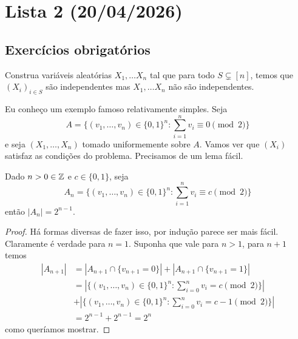 \section{Lista 2 (20/04/2026)}

\subsection{Exercícios obrigatórios}
\begin{exercise}
	\label{lista2:ex1}
	Construa variáveis aleatórias $X_1, \dots X_n$ tal que para todo
	$S \subsetneq [n]$,
	temos que $(X_i)_{i \in S}$ são independentes mas $X_1, \dots X_n$
	não são independentes.
\end{exercise}

Eu conheço um exemplo famoso relativamente simples. Seja
\[
	A = \{(v_1, \dots, v_n) \in \{0,1\}^n : \sum_{i = 1}^n v_i \equiv 0 \pmod 2\}
\]
e seja $(X_1, \dots, X_n)$ tomado uniformemente sobre $A$. Vamos ver
que $(X_i)$ satisfaz as condições do problema. Precisamos de um lema fácil.
\begin{lemma}
	Dado $n > 0 \in \mathbb{Z}$ e $c \in \{0,1\}$, seja
	\[ A_n = \{(v_1, \dots, v_n) \in \{0,1\}^n : \sum_{i = 1}^n v_i \equiv
	c \pmod 2\}\]
	então $|A_n| = 2^{n-1}$.
\end{lemma}

\begin{proof}
	Há formas diversas de fazer isso, por indução parece ser mais fácil.
	Claramente é verdade para $n = 1$.
	Suponha que vale para $n > 1$, para $n+1$ temos
	\begin{align*}
		|A_{n+1}| &= |A_{n+1}\cap\{v_{n+1} = 0\}| + |A_{n+1} \cap \{v_{n+1}=1\}|\\
		&= |\{(v_1,\dots,v_n) \in \{0,1\}^n : \sum_{i=0}^{n} v_i = c \pmod 2\}|\\
		&+ |\{(v_1,\dots,v_n) \in \{0,1\}^n : \sum_{i=0}^{n} v_i = c - 1 \pmod 2\}|\\
		&= 2^{n-1} + 2^{n-1} = 2^{n}
	\end{align*}
	como queríamos mostrar.
\end{proof}

